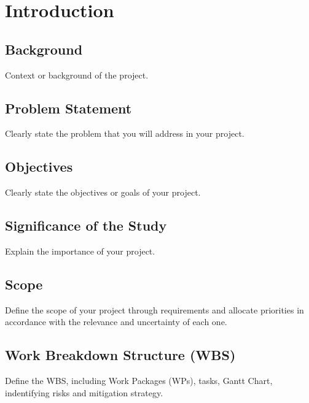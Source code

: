 \documentclass[11pt,twoside,a4paper]{report}
\begin{document}

\MakeCover


\tableofcontents

\listoffigures
\listoftables

\newpage


\chapter{Introduction}
\section{Background}
Context or background of the project.
\section{Problem Statement}
Clearly state the problem that you will address in your project.
\section{Objectives}
Clearly state the objectives or goals of your project.
\section{Significance of the Study}
Explain the importance of your project.
\section{Scope}
Define the scope of your project through requirements and allocate priorities in accordance with the relevance and uncertainty of each one.
\section{Work Breakdown Structure (WBS)}
Define the WBS, including Work Packages (WPs), tasks, Gantt Chart, indentifying risks and mitigation strategy.
\end{document}
